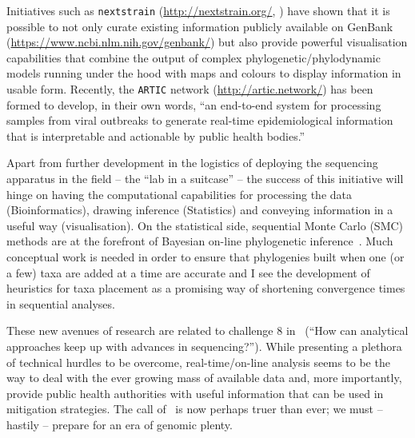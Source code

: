 Initiatives such as \verb|nextstrain| (\url{http://nextstrain.org/}, \cite{Hadfield2017}) have shown that it is possible to not only curate existing information publicly available on GenBank (\url{https://www.ncbi.nlm.nih.gov/genbank/}) but also provide powerful visualisation capabilities that combine the output of complex phylogenetic/phylodynamic models running under the hood with maps and colours to display information in usable form.
Recently, the \verb|ARTIC| network (\url{http://artic.network/}) has been formed to develop, in their own words, ``an end-to-end system for processing samples from viral outbreaks to generate real-time epidemiological information that is interpretable and actionable by public health bodies.'' 

Apart from further development in the logistics of deploying the sequencing apparatus in the field -- the ``lab in a suitcase'' -- the success of this initiative will hinge on having the computational capabilities for processing the data (Bioinformatics), drawing inference (Statistics) and conveying information in a useful way (visualisation).
On the statistical side, sequential Monte Carlo (SMC) methods are at the forefront of Bayesian on-line phylogenetic inference~\citep{Dinh2016,Fourment2017,Everitt2018}.
Much conceptual work is needed in order to ensure that phylogenies built when one (or a few) taxa are added at a time are accurate and I see the development of heuristics for taxa placement as a promising way of shortening convergence times in sequential analyses.

These new avenues of research are related to challenge 8 in~\cite{Frost2015} (``How can analytical approaches keep up with advances in sequencing?'').
While presenting a plethora of technical hurdles to be overcome, real-time/on-line analysis seems to be the way to deal with the ever growing mass of available data and, more importantly, provide public health authorities with useful information that can be used in mitigation strategies.
The call of~\cite{Pybus2013} is now perhaps truer than ever; we must -- hastily -- prepare for an era of genomic plenty.

% 
